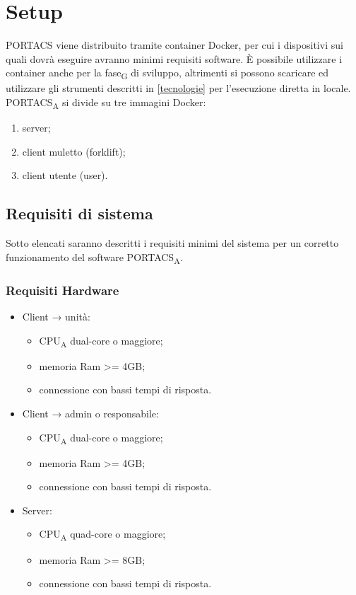 \section{Setup}
PORTACS viene distribuito tramite container Docker, per cui i dispositivi sui quali dovrà eseguire avranno minimi requisiti software. È possibile utilizzare i container anche per la fase\textsubscript{G} di sviluppo, altrimenti si possono scaricare ed utilizzare gli strumenti descritti in \ref{tecnologie} per l'esecuzione diretta in locale. PORTACS\textsubscript{A} si divide su tre immagini Docker:
\begin{enumerate}
    \item server;
    \item client muletto (forklift);
    \item client utente (user).
\end{enumerate}


\subsection{Requisiti di sistema}
Sotto elencati saranno descritti i requisiti minimi del sistema per un corretto funzionamento del software PORTACS\textsubscript{A}.


\subsubsection{Requisiti Hardware}
\begin{itemize}
	\item Client → unità:
\begin{itemize}
	\item CPU\textsubscript{A} dual-core o maggiore;
	\item memoria Ram >= 4GB;
	\item connessione con bassi tempi di risposta.
\end{itemize}
	\item Client → admin o responsabile:
\begin{itemize}
	\item CPU\textsubscript{A} dual-core o maggiore;
	\item memoria Ram >= 4GB;
	\item connessione con bassi tempi di risposta.
\end{itemize}
	\item Server:
\begin{itemize}
	\item CPU\textsubscript{A} quad-core o maggiore;
	\item memoria Ram >= 8GB;
	\item connessione con bassi tempi di risposta.
\end{itemize}
\end{itemize}

